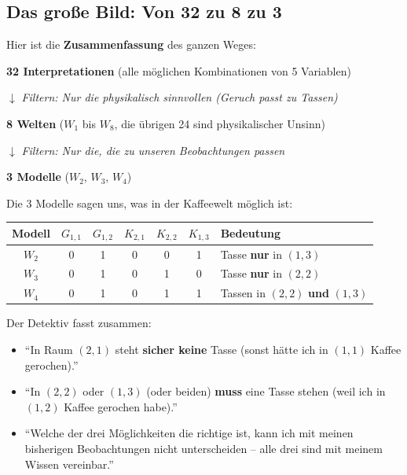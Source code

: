 \documentclass[a4paper,12pt]{article}
\begin{document}

\subsection{Das gro\ss e Bild: Von 32 zu 8 zu 3}

\begin{merkbox}
Hier ist die \textbf{Zusammenfassung} des ganzen Weges:

\bigskip
\textbf{32 Interpretationen} (alle m\"oglichen Kombinationen von 5 Variablen)

$\downarrow$ \textit{Filtern: Nur die physikalisch sinnvollen (Geruch passt zu Tassen)}

\textbf{8 Welten} ($W_1$ bis $W_8$, die \"ubrigen 24 sind physikalischer Unsinn)

$\downarrow$ \textit{Filtern: Nur die, die zu unseren Beobachtungen passen}

\textbf{3 Modelle} ($W_2$, $W_3$, $W_4$)
\end{merkbox}

Die 3 Modelle sagen uns, was in der Kaffeewelt m\"oglich ist:

\begin{center}
\renewcommand{\arraystretch}{1.4}
\begin{tabular}{c|ccccc|l}
\toprule
Modell & $G_{1,1}$ & $G_{1,2}$ & $K_{2,1}$ & $K_{2,2}$ & $K_{1,3}$ & Bedeutung \\
\midrule
$W_2$ & 0 & 1 & 0 & 0 & 1 & Tasse \textbf{nur} in $(1{,}3)$ \\
$W_3$ & 0 & 1 & 0 & 1 & 0 & Tasse \textbf{nur} in $(2{,}2)$ \\
$W_4$ & 0 & 1 & 0 & 1 & 1 & Tassen in $(2{,}2)$ \textbf{und} $(1{,}3)$ \\
\bottomrule
\end{tabular}
\end{center}

\begin{analogie}[title={Analogie: Detektivarbeit abgeschlossen}]
Der Detektiv fasst zusammen:
\begin{itemize}
\item "`In Raum $(2{,}1)$ steht \textbf{sicher keine} Tasse (sonst h\"atte ich in $(1{,}1)$ Kaffee gerochen)."'
\item "`In $(2{,}2)$ oder $(1{,}3)$ (oder beiden) \textbf{muss} eine Tasse stehen (weil ich in $(1{,}2)$ Kaffee gerochen habe)."'
\item "`Welche der drei M\"oglichkeiten die richtige ist, kann ich mit meinen bisherigen Beobachtungen nicht unterscheiden -- alle drei sind mit meinem Wissen vereinbar."'
\end{itemize}
\end{analogie}
\end{document}
